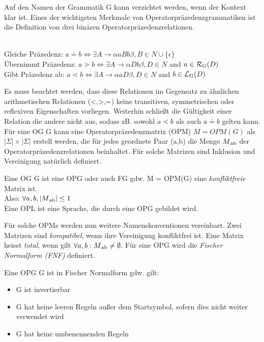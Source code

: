 Auf den Namen der Grammatik G kann verzichtet werden, wenn der Kontext klar ist. Eines der wichtigsten Merkmale von Operatorpräzedenzgrammatiken ist die Definition von drei binären Operatorpräzedenzrelationen.
\begin{definition}[Präzedenzrelationen]\ \\
\label{relationen}
Gleiche Präzedenz: $ a \doteq b \Leftrightarrow \exists A \rightarrow \alpha aBb \beta , 
		B \in N \cup \{ \epsilon \}$ \\
		Übernimmt Präzedenz: $ a \gtrdot b \Leftrightarrow \exists A \rightarrow \alpha Db \beta , D \in N $ and $ a \in
		\mathcal{R}\textsubscript{G}(D)$ \\
		Gibt Präzedenz ab: $ a \lessdot b \Leftrightarrow \exists A \rightarrow \alpha aD \beta , D \in N $ and $ b \in
		\mathcal{L}\textsubscript{G}(D)$
\end{definition}
Es muss beachtet werden, dass diese Relationen im Gegensatz zu ähnlichen arithmetischen Relationen (<,>,=) keine transitiven, symmetrischen oder reflexiven Eigenschaften vorliegen. Weiterhin schließt die Gültigkeit einer Relation die andere nicht aus, sodass zB. sowohl $a \lessdot b$ als auch $a \doteq b$ gelten kann.
Für eine OG G kann eine Operatorpräzedenzmatrix (OPM) $M = OPM(G)$ als $|\Sigma | \times |\Sigma |$ erstell werden, die für jedes geordnete Paar (a,b) die Menge $M \textsubscript{ab}$ der Operatorpräzedenzrelationen beinhaltet. Für solche Matrizen sind Inklusion und Vereinigung natürlich definiert.

\begin{definition}
Eine OG G ist eine OPG oder auch FG gdw. M = OPM(G) eine \textit{konfliktfreie} Matrix ist.\\ 
Also: $\forall a, b, |M \textsubscript{ab} | \leq 1$\\
Eine OPL ist eine Sprache, die durch eine OPG gebildet wird.
\end{definition}

Für solche OPMs werden nun weitere Namenskonventionen vereinbart. Zwei Matrizen sind \textit{kompatibel}, wenn ihre Vereinigung konfliktfrei ist. Eine Matrix heisst \textit{total}, wenn gilt $\forall a, b: M \textsubscript{ab} \neq \emptyset$.
Für eine OPG wird die \textit{Fischer Normalform (FNF)} definiert.

\begin{definition}[Fischernormalform]
Eine OPG G ist in Fischer Normalform gdw. gilt:
\begin{itemize}
\item
G ist invertierbar
\item
G hat keine leeren Regeln außer dem Startsymbol, sofern dies nicht weiter verwendet wird
\item 
G hat keine umbenennenden Regeln
\end{itemize}
\end{definition}

